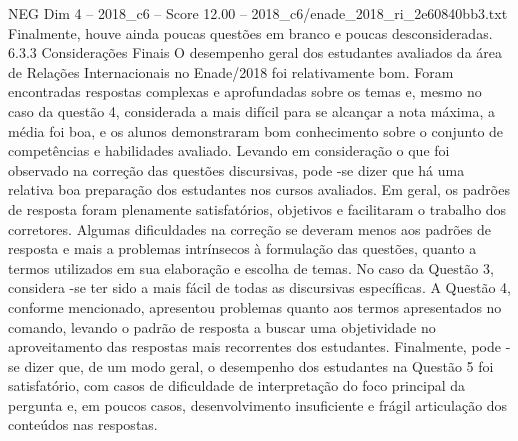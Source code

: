 \begin{textsample}{NEG Dim 4 – 2018\_c6 – Score 12.00 – 2018\_c6/enade\_2018\_ri\_2e60840bb3.txt}
Finalmente, houve ainda poucas questões em branco e poucas desconsideradas. 6.3.3 Considerações Finais O desempenho geral dos estudantes avaliados da área de Relações Internacionais no Enade/2018 foi relativamente bom.
Foram encontradas respostas complexas e aprofundadas sobre os temas e, mesmo no caso da questão 4, considerada a mais difícil para se alcançar a nota máxima, a média foi boa, e os alunos demonstraram bom conhecimento sobre o conjunto de competências e habilidades avaliado.
Levando em consideração o que foi observado na correção das questões discursivas, pode -se dizer que há uma relativa boa preparação dos estudantes nos cursos avaliados.
Em geral, os padrões de resposta foram plenamente satisfatórios, objetivos e facilitaram o trabalho dos corretores.
Algumas dificuldades na correção se deveram menos aos padrões de resposta e mais a problemas intrínsecos à formulação das questões, quanto a termos utilizados em sua elaboração e escolha de temas.
No caso da Questão 3, considera -se ter sido a mais fácil de todas as discursivas específicas.
A Questão 4, conforme mencionado, apresentou problemas quanto aos termos apresentados no comando, levando o padrão de resposta a buscar uma objetividade no aproveitamento das respostas mais recorrentes dos estudantes.
Finalmente, pode -se dizer que, de um modo geral, o desempenho dos estudantes na Questão 5 foi satisfatório, com casos de dificuldade de interpretação do foco principal da pergunta e, em poucos casos, desenvolvimento insuficiente e frágil articulação dos conteúdos nas respostas.

\end{textsample}
